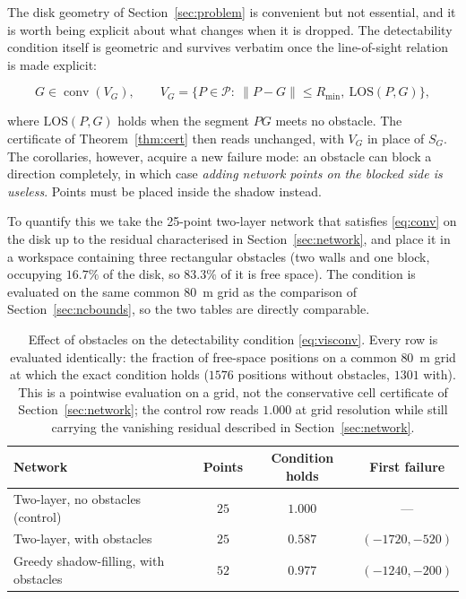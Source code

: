 \documentclass[journal,10pt]{IEEEtran}
\theoremstyle{definition}
\newcommand{\conv}{\operatorname{conv}}
\newcommand{\Rmin}{R_{\min}}
\newcommand{\bP}{\mathcal{P}}
\begin{document}
The disk geometry of Section~\ref{sec:problem} is convenient but not essential, and it is worth
being explicit about what changes when it is dropped. The detectability condition itself is
geometric and survives verbatim once the line-of-sight relation is made explicit:

\begin{equation}
G\in\conv(V_G),\qquad
V_G=\{P\in\bP:\ \|P-G\|\le\Rmin,\ \mathrm{LOS}(P,G)\},
\label{eq:visconv}
\end{equation}

where $\mathrm{LOS}(P,G)$ holds when the segment $PG$ meets no obstacle. The certificate of
Theorem~\ref{thm:cert} then reads unchanged, with $V_G$ in place of $S_G$. The corollaries,
however, acquire a new failure mode: an obstacle can block a direction completely, in which case
\emph{adding network points on the blocked side is useless}. Points must be placed inside the
shadow instead.

To quantify this we take the 25-point two-layer network that satisfies \eqref{eq:conv} on the disk up to the residual characterised in Section~\ref{sec:network}, and place it in a workspace containing three rectangular obstacles (two walls and one
block, occupying $16.7\%$ of the disk, so $83.3\%$ of it is free space). The condition is
evaluated on the same common $80$~m grid as the comparison of Section~\ref{sec:ncbounds}, so the
two tables are directly comparable.

\begin{table}[t]
\caption{Effect of obstacles on the detectability condition \eqref{eq:visconv}. Every row is
evaluated identically: the fraction of free-space positions on a common $80$~m grid at which the
exact condition holds ($1576$ positions without obstacles, $1301$ with). This is a pointwise
evaluation on a grid, not the conservative cell certificate of Section~\ref{sec:network}; the
control row reads $1.000$ at grid resolution while still carrying the vanishing residual
described in Section~\ref{sec:network}.}
\label{tab:obstacles}
\centering
\small
\begin{tabular}{lccc}
\toprule
Network & Points & Condition holds & First failure \\
\midrule
Two-layer, no obstacles (control)   & $25$ & $1.000$ & --- \\
Two-layer, with obstacles           & $25$ & $0.587$ & $(-1720,-520)$ \\
Greedy shadow-filling, with obstacles & $52$ & $0.977$ & $(-1240,-200)$ \\
\bottomrule
\end{tabular}
\end{table}
\end{document}

